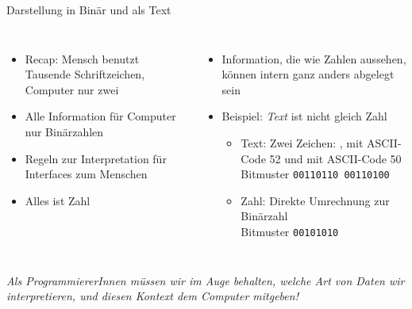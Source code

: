 \begin{frame}[fragile]{Darstellung in Binär und als Text}
%
\begin{columns}[T]
\begin{itemize}
\item Recap: Mensch benutzt Tausende Schriftzeichen, Computer nur zwei
\item Alle Information für Computer nur Binärzahlen
\item Regeln zur Interpretation für Interfaces zum Menschen
\item[\Thus] Alles ist Zahl
\end{itemize}
%
\begin{itemize}
\item Information, die wie Zahlen aussehen, können intern ganz anders abgelegt sein
\item Beispiel: \emph{Text}  ist nicht gleich Zahl 
	\begin{itemize}
	\item Text: Zwei Zeichen: , mit ASCII-Code 52 und  mit ASCII-Code 50\\
		Bitmuster \texttt{00110110 00110100}
	\item Zahl: Direkte Umrechnung zur Binärzahl\\
		Bitmuster \texttt{00101010}
	\end{itemize}
\end{itemize}
\end{columns}
%
\begin{center}
	\begin{large}
	\Thus \emph{Als ProgrammiererInnen müssen wir im Auge behalten, welche Art von Daten wir interpretieren, und diesen Kontext dem Computer mitgeben!}
	\end{large}
\end{center}
%
\end{frame}


